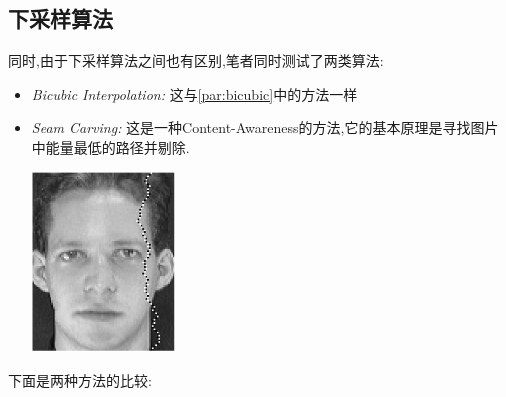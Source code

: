 \subsection{下采样算法} 同时,由于下采样算法之间也有区别,笔者同时测试了两类算法:
\begin{itemize}
	\item \textit{Bicubic Interpolation:} 这与\ref{par:bicubic}中的方法一样
	\item \textit{Seam Carving:} 这是一种Content-Awareness的方法,它的基本原理是寻找图片中能量最低的路径并剔除.
		\begin{center}
	\begin{minipage}[t]{\linewidth}
	\center
	{
	\captionsetup{justification=centering}
	\includegraphics[width=0.3\textwidth]{Img/c4/seam_demo} 
	}
	\end{minipage}
	\medskip
	\end{center}
\end{itemize}
下面是两种方法的比较:
